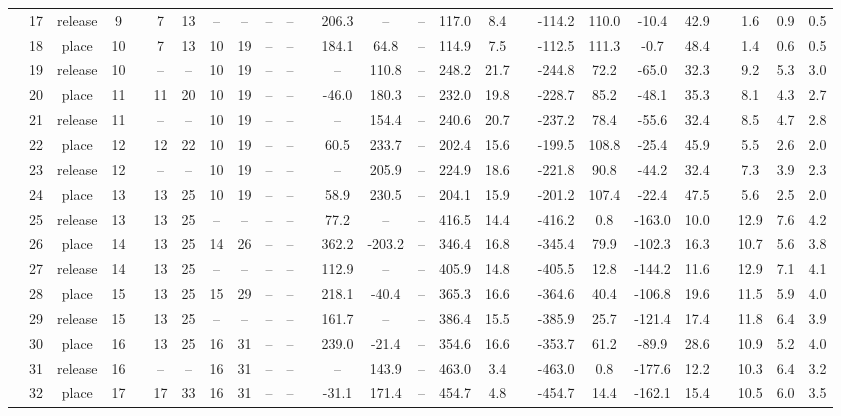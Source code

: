 \begin{landscape}
\begin{table}[h!]
\begin{threeparttable}
\begin{tabular}{c cccr ccccccr cccccr ccccr ccc}
				&17 &release &9 &&7 &13 &-- &-- &-- &-- &&206.3 &-- &-- &117.0 &8.4 &&-114.2 &110.0 &-10.4 &42.9 &&1.6 &0.9 &0.5 \\
				&18 &place &10 &&7 &13 &10 &19 &-- &-- &&184.1 &64.8 &-- &114.9 &7.5 &&-112.5 &111.3 &-0.7 &48.4 &&1.4 &0.6 &0.5 \\
				\rowcolor{lightgray} &19 &release &10 &&-- &-- &10 &19 &-- &-- &&-- &110.8 &-- &248.2 &21.7 &&-244.8 &72.2 &-65.0 &32.3 &&9.2 &5.3 &3.0 \\
				\rowcolor{lightgray} &20 &place &11 &&11 &20 &10 &19 &-- &-- &&-46.0 &180.3 &-- &232.0 &19.8 &&-228.7 &85.2 &-48.1 &35.3 &&8.1 &4.3 &2.7 \\
				&21 &release &11 &&-- &-- &10 &19 &-- &-- &&-- &154.4 &-- &240.6 &20.7 &&-237.2 &78.4 &-55.6 &32.4 &&8.5 &4.7 &2.8 \\
				&22 &place &12 &&12 &22 &10 &19 &-- &-- &&60.5 &233.7 &-- &202.4 &15.6 &&-199.5 &108.8 &-25.4 &45.9 &&5.5 &2.6 &2.0 \\
				&23 &release &12 &&-- &-- &10 &19 &-- &-- &&-- &205.9 &-- &224.9 &18.6 &&-221.8 &90.8 &-44.2 &32.4 &&7.3 &3.9 &2.3 \\
				&24 &place &13 &&13 &25 &10 &19 &-- &-- &&58.9 &230.5 &-- &204.1 &15.9 &&-201.2 &107.4 &-22.4 &47.5 &&5.6 &2.5 &2.0 \\
				\rowcolor{lightgray} &25 &release &13 &&13 &25 &-- &-- &-- &-- &&77.2 &-- &-- &416.5 &14.4 &&-416.2 &0.8 &-163.0 &10.0 &&12.9 &7.6 &4.2 \\
				\rowcolor{lightgray} &26 &place &14 &&13 &25 &14 &26 &-- &-- &&362.2 &-203.2 &-- &346.4 &16.8 &&-345.4 &79.9 &-102.3 &16.3 &&10.7 &5.6 &3.8 \\
				&27 &release &14 &&13 &25 &-- &-- &-- &-- &&112.9 &-- &-- &405.9 &14.8 &&-405.5 &12.8 &-144.2 &11.6 &&12.9 &7.1 &4.1 \\
				&28 &place &15 &&13 &25 &15 &29 &-- &-- &&218.1 &-40.4 &-- &365.3 &16.6 &&-364.6 &40.4 &-106.8 &19.6 &&11.5 &5.9 &4.0 \\
				&29 &release &15 &&13 &25 &-- &-- &-- &-- &&161.7 &-- &-- &386.4 &15.5 &&-385.9 &25.7 &-121.4 &17.4 &&11.8 &6.4 &3.9 \\
				&30 &place &16 &&13 &25 &16 &31 &-- &-- &&239.0 &-21.4 &-- &354.6 &16.6 &&-353.7 &61.2 &-89.9 &28.6 &&10.9 &5.2 &4.0 \\
				\rowcolor{lightgray} &31 &release &16 &&-- &-- &16 &31 &-- &-- &&-- &143.9 &-- &463.0 &3.4 &&-463.0 &0.8 &-177.6 &12.2 &&10.3 &6.4 &3.2 \\
				\rowcolor{lightgray} &32 &place &17 &&17 &33 &16 &31 &-- &-- &&-31.1 &171.4 &-- &454.7 &4.8 &&-454.7 &14.4 &-162.1 &15.4 &&10.5 &6.0 &3.5 \\

\end{tabular}
\end{threeparttable}
\end{table}
\end{landscape}

